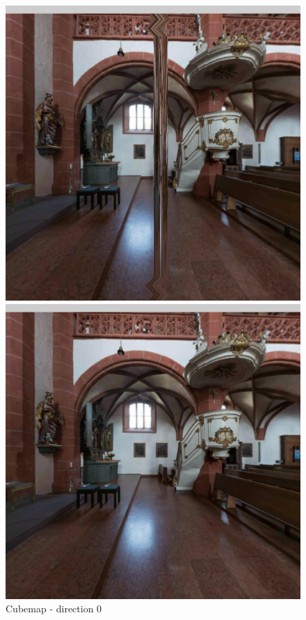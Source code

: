 \documentclass[12pt]{article}
\begin{document}
\begin{figure}[H]
  \centering
  \begin{minipage}[b]{0.3\textwidth}
    \includegraphics[width=1\textwidth]{../images/screenshots/Screenshot_0_Equi2Cube.jpg}
    \caption{Cubemap - direction 0}
    \label{fig:cubemap_direction_0}
  \end{minipage}
  \hfill
  \begin{minipage}[b]{0.3\textwidth}
    \centering
    \includegraphics[width=1\textwidth]{../images/screenshots/Screenshot_0_Skybox.jpg}

\end{minipage}
\end{figure}
\end{document}
